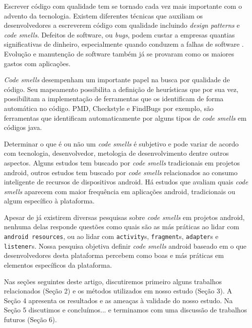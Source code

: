 Escrever c\'odigo com qualidade tem se tornado cada vez mais importante com o advento da tecnologia. Existem diferentes t\'ecnicas que auxiliam os desenvolvedores a escreverem c\'odigo com qualidade incluindo \textit{design patterns} e \textit{code smells}. Defeitos de software, ou \textit{bugs}, podem custar a empresas quantias significativas de dinheiro, especialmente quando conduzem a falhas de software \cite{Nagappan:2005, briand1993modeling}. Evolu\c{c}\~ao e manuten\c{c}\~ao de software tamb\'em j\'a se provaram como os maiores gastos com aplica\c{c}\~oes.

\textit{Code smells} desempenham um importante papel na busca por qualidade de c\'odigo. Seu mapeamento possibilita a defini\c{c}\~ao de heur\'isticas que por sua vez, possibilitam a implementa\c{c}\~ao de ferramentas que os identificam de forma autom\'atica no c\'odigo. PMD, Checkstyle e FindBugs por exemplo, s\~ao ferramentas que identificam automaticamente por alguns tipos de \textit{code smells} em c\'odigos java.

Determinar o que \'e ou n\~ao um \textit{code smells} \'e subjetivo e pode variar de acordo com tecnologia, desenvolvedor, metologia de desenvolvimento dentre outros aspectos. Alguns estudos tem buscado por \textit{code smells} tradicionais em projetos android, outros estudos tem buscado por \textit{code smells} relacionados ao consumo inteligente de recursos de dispositivos android. H\'a estudos que avaliam quais \textit{code smells} aparecem com maior frequ\^encia em aplica\c{c}\~oes android, tradicionais ou algum espec\'ifico \`a plataforma.

Apesar de j\'a existirem diversas pesquisas sobre \textit{code smells} em projetos android, nenhuma delas responde quest\~oes como quais s\~ao as m\'as pr\'aticas ao lidar com \texttt{android resources}, ou ao lidar com \texttt{activity}s, \texttt{fragment}s, \texttt{adapter}s e \texttt{listener}s. Nossa pesquisa objetiva definir \textit{code smells} android baseado em o que desenvolvedores desta plataforma percebem como boas e m\'as pr\'aticas em elementos espec\'ificos da plataforma.

Nas se\c{c}\~oes seguintes deste artigo, discutiremos primeiro alguns trabalhos relacionados (Se\c{c}\~ao 2) e os m\'etodos utilizados em nosso estudo (Se\c{c}\~ao 3). A Se\c{c}\~ao 4 apresenta os resultados e as amea\c{c}as \`a validade do nosso estudo. Na Se\c{c}\~ao 5 discutimos e conclu\'imos... e terminamos com uma discuss\~ao de trabalhos futuros (Se\c{c}\~ao 6).
